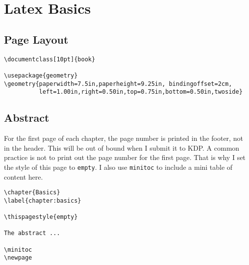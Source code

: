 

\chapter{Latex Basics}
\label{chapter:basics}

\thispagestyle{empty}


\lipsum[2]
 

\minitoc
\newpage



\section{Page Layout} 


\begin{lstlisting}
\documentclass[10pt]{book}

\usepackage{geometry}
\geometry{paperwidth=7.5in,paperheight=9.25in, bindingoffset=2cm,
          left=1.00in,right=0.50in,top=0.75in,bottom=0.50in,twoside}
\end{lstlisting}
 


\section{Abstract}
\label{basics:abstract}

For the first page of each chapter, the page number is printed in the footer, not
in the header. This will be out of bound when I submit it to KDP. 
A common practice is not to print out the page number for the first page.
That is why I set the style of this page to \texttt{empty}. 
I also use \texttt{minitoc} to include a mini table of content 
here. 

\begin{lstlisting}
\chapter{Basics}
\label{chapter:basics}

\thispagestyle{empty}

The abstract ...

\minitoc
\newpage
\end{lstlisting}



